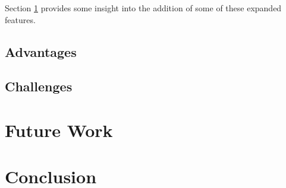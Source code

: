 \documentclass[11pt,twocolumn]{article}
\begin{document}
Section \ref{sec:futurework} provides some insight into the addition
of some of these expanded features.

\subsection{Advantages}
\label{sec:advantages}

\subsection{Challenges}
\label{sec:challenges}

\section{Future Work}
\label{sec:futurework}

\section{Conclusion}
\label{sec:conclusion}


\end{document}
